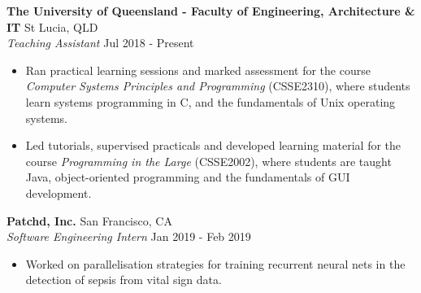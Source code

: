 \documentclass[a4paper]{article}
\newenvironment{myitemize}
{   \small
    \vspace{-2pt}
    \begin{itemize}
    \setlength{\itemsep}{0pt}
    \setlength{\parskip}{0pt}
    \setlength{\parsep}{0pt}     }
{ \end{itemize}                  }
\begin{document}
\textbf{The University of Queensland - Faculty of Engineering, Architecture \& IT} \hfill St Lucia, QLD\\
\textit{Teaching Assistant} \hfill Jul 2018 - Present\\
\vspace{-0.5mm}
\begin{myitemize} \itemsep 0.5mm
	\item Ran practical learning sessions and marked assessment for the course \textit{Computer Systems Principles and Programming} (CSSE2310),  where students learn systems programming in C, and the fundamentals of Unix operating systems.
	\item Led tutorials, supervised practicals and developed learning material for the course \textit{Programming in the Large} (CSSE2002), where students are taught Java, object-oriented programming and the fundamentals of GUI development.
\end{myitemize}

\textbf{Patchd, Inc.} \hfill San Francisco, CA\\
\textit{Software Engineering Intern} \hfill  Jan 2019 - Feb 2019\\
\begin{myitemize} \itemsep 0.5mm
	\item Worked on parallelisation strategies for training recurrent neural nets in the detection of sepsis from vital sign data.
\end{myitemize}
\end{document}
